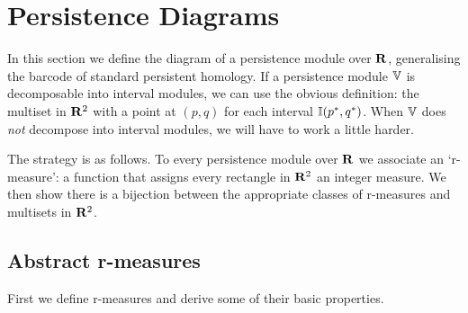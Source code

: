 \section{Persistence Diagrams}
\label{section-diagrams}

In this section we define the diagram of a persistence module over $\mathbf{R}$, generalising the barcode of standard persistent homology. If a persistence module $\mathbb{V}$ is decomposable into interval modules, we can use the obvious definition: the multiset in $\mathbf{R}^2$ with a point at $(p, q)$ for each interval $\mathbb{I}(p^*, q^*)$. When $\mathbb{V}$ does \emph{not} decompose into interval modules, we will have to work a little harder.

The strategy is as follows. To every persistence module over $\mathbf{R}$ we associate an `r-measure': a function that assigns every rectangle in $\mathbf{R}^2$ an integer measure. We then show there is a bijection between the appropriate classes of r-measures and multisets in $\mathbf{R}^2$.

\subsection{Abstract r-measures}

First we define r-measures and derive some of their basic properties.

